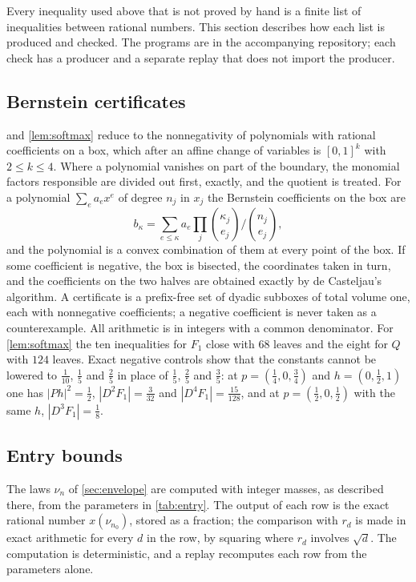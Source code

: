 \documentclass[11pt]{amsart}
\theoremstyle{definition}
\theoremstyle{remark}
\begin{document}
Every inequality used above that is not proved by hand is a finite list of inequalities between rational
numbers. This section describes how each list is produced and checked. The programs are in the accompanying
repository; each check has a producer and a separate replay that does not import the producer.

\subsection{Bernstein certificates}
 and \cref{lem:softmax} reduce to the nonnegativity of polynomials with
rational coefficients on a box, which after an affine change of variables is $[0,1]^k$ with $2\le k\le4$. Where
a polynomial vanishes on part of the boundary, the monomial factors responsible are divided out first, exactly,
and the quotient is treated. For a polynomial $\sum_ea_ex^e$ of degree $n_j$ in $x_j$ the
Bernstein coefficients on the box are
\[
b_\kappa=\sum_{e\le\kappa}a_e\prod_j\binom{\kappa_j}{e_j}\Big/\binom{n_j}{e_j},
\]
and the polynomial is a convex combination of them at every point of the box. If some coefficient is negative,
the box is bisected, the coordinates taken in turn, and the coefficients on the two halves are obtained exactly by
de Casteljau's algorithm. A certificate is a prefix-free set of dyadic subboxes of total volume one, each with
nonnegative coefficients; a negative coefficient is never taken as a counterexample. All arithmetic is in
integers with a common denominator. For \cref{lem:softmax} the ten inequalities for $F_1$ close with $68$ leaves
and the eight for $Q$ with $124$ leaves. Exact negative controls show that the constants cannot be lowered to
$\tfrac1{10}$, $\tfrac15$ and $\tfrac25$ in place of $\tfrac15$, $\tfrac25$ and $\tfrac35$: at $p=(\tfrac14,0,\tfrac34)$ and
$h=(0,\tfrac12,1)$ one has $|Ph|^2=\tfrac12$, $|D^2F_1|=\tfrac3{32}$ and $|D^4F_1|=\tfrac{15}{128}$, and at
$p=(\tfrac12,0,\tfrac12)$ with the same $h$, $|D^3F_1|=\tfrac18$.

\subsection{Entry bounds}
The laws $\nu_n$ of \cref{sec:envelope} are computed with integer masses, as described there, from the parameters
in \cref{tab:entry}. The output of each row is the exact rational number $x(\nu_{n_0})$, stored as a fraction;
the comparison with $r_d$ is made in exact arithmetic for every $d$ in the row, by squaring where $r_d$ involves
$\sqrt d$. The computation is deterministic, and a replay recomputes each row from the parameters alone.
\end{document}
